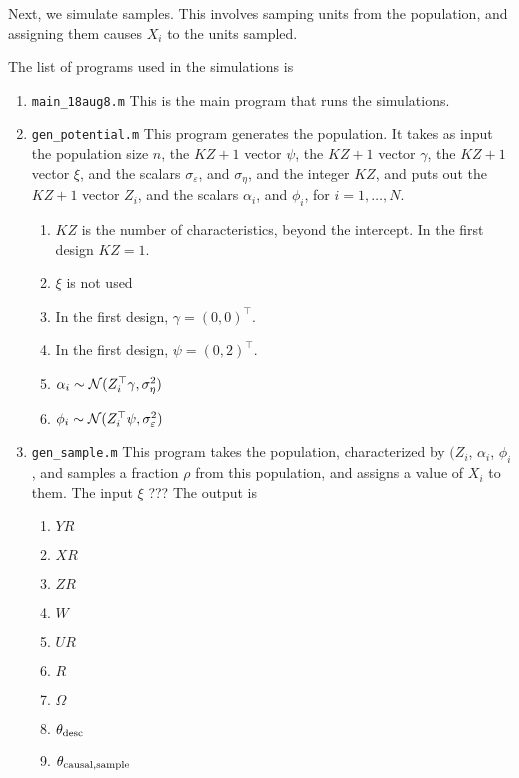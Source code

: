 \documentclass[11pt,fleqn]{article}
\begin{document}
Next, we simulate samples. This involves samping units from the population, and assigning them causes $X_i$ to the units sampled.

\vskip0.5cm

The list of programs used in the simulations is
\begin{enumerate}
  \item {\tt main\_18aug8.m} This is the main program that runs the simulations.
  \item {\tt gen\_potential.m} This program generates the population. It takes as input the population size $n$, the $KZ+1$ vector $\psi$, the $KZ+1$ vector $\gamma$, the $KZ+1$ vector $\xi$, and the scalars $\sigma_\varepsilon$, and $\sigma_\eta$, and the integer $KZ$, and puts out the $KZ+1$ vector $Z_i$, and the scalars $\alpha_i$, and $\phi_i$, for $i=1,\ldots,N$.
 \begin{enumerate}
\item $KZ$ is the number of characteristics, beyond the intercept. In the first design $KZ=1$. 
\item $\xi$ is not used
\item In the first design, $\gamma=(0,0)^\top$.
\item In the first design, $\psi=(0,2)^\top$.
\item $\alpha_i\sim{\cal N}(Z_i^\top\gamma,\sigma_\eta^2)$
\item $\phi_i\sim{\cal N}(Z_i^\top\psi,\sigma_\varepsilon^2)$\end{enumerate}
\item {\tt gen\_sample.m} This program takes the population, characterized by $(Z_i$, $\alpha_i$, $\phi_i$, and samples a fraction $\rho$ from this population, and assigns a value of $X_i$ to them. 
The input $\xi$ ???
The output is
\begin{enumerate}
\item $YR$
\item $XR$
\item $ZR$
\item $W$
\item $UR$
\item $R$
\item $\Omega$
\item $\theta_{\rm desc}$
\item $\theta_{\rm causal,sample}$
\end{enumerate}  

\end{enumerate}
\end{document}
